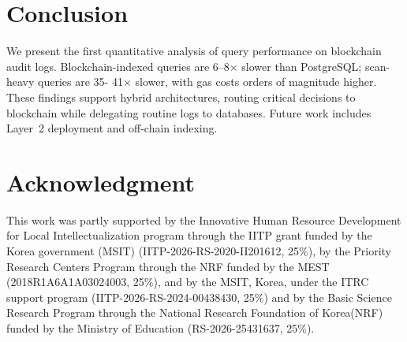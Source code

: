 \documentclass[conference]{IEEEtran}
\begin{document}
\section{Conclusion}
We present the first quantitative analysis of query performance on blockchain audit logs. Blockchain-indexed queries are 6--8$\times$ slower than PostgreSQL; scan-heavy queries are 35- 41$\times$ slower, with gas costs orders of magnitude higher. These findings support hybrid architectures, routing critical decisions to blockchain while delegating routine logs to databases. Future work includes Layer~2 deployment and off-chain indexing.


\section*{Acknowledgment}
This work was partly supported by the Innovative Human Resource Development for Local Intellectualization program through the IITP grant funded by the Korea government (MSIT) (IITP-2026-RS-2020-II201612, 25\%), by the Priority Research Centers Program through the NRF funded by the MEST (2018R1A6A1A03024003, 25\%), and by the MSIT, Korea, under the ITRC support program (IITP-2026-RS-2024-00438430, 25\%) and by the Basic Science Research Program through the National Research Foundation of Korea(NRF) funded by the Ministry of Education (RS-2026-25431637, 25\%).



\end{document}
